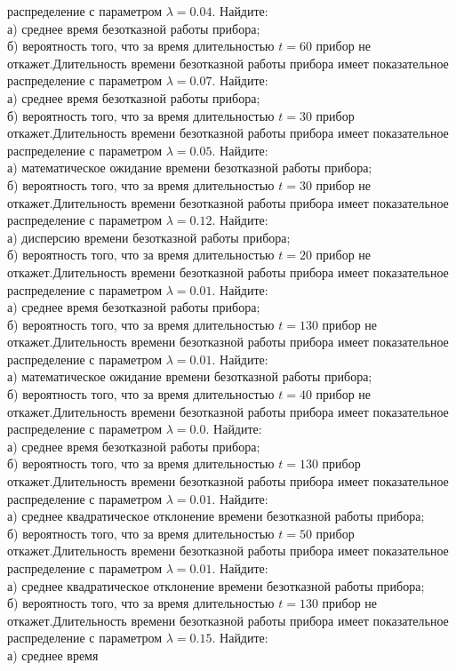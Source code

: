распределение с параметром $\lambda = 0.04$. Найдите: \\ \quad а) среднее время безотказной работы прибора; \\ \quad б) вероятность того, что за время длительностью $t = 60$ прибор не откажет.Длительность времени безотказной работы прибора имеет показательное распределение с параметром $\lambda = 0.07$. Найдите: \\ \quad а) среднее время безотказной работы прибора; \\ \quad б) вероятность того, что за время длительностью $t = 30$ прибор откажет.Длительность времени безотказной работы прибора имеет показательное распределение с параметром $\lambda = 0.05$. Найдите: \\ \quad а) математическое ожидание времени безотказной работы прибора; \\ \quad б) вероятность того, что за время длительностью $t = 30$ прибор не откажет.Длительность времени безотказной работы прибора имеет показательное распределение с параметром $\lambda = 0.12$. Найдите: \\ \quad а) дисперсию времени безотказной работы прибора; \\ \quad б) вероятность того, что за время длительностью $t = 20$ прибор не откажет.Длительность времени безотказной работы прибора имеет показательное распределение с параметром $\lambda = 0.01$. Найдите: \\ \quad а) среднее время безотказной работы прибора; \\ \quad б) вероятность того, что за время длительностью $t = 130$ прибор не откажет.Длительность времени безотказной работы прибора имеет показательное распределение с параметром $\lambda = 0.01$. Найдите: \\ \quad а) математическое ожидание времени безотказной работы прибора; \\ \quad б) вероятность того, что за время длительностью $t = 40$ прибор не откажет.Длительность времени безотказной работы прибора имеет показательное распределение с параметром $\lambda = 0.0$. Найдите: \\ \quad а) среднее время безотказной работы прибора; \\ \quad б) вероятность того, что за время длительностью $t = 130$ прибор откажет.Длительность времени безотказной работы прибора имеет показательное распределение с параметром $\lambda = 0.01$. Найдите: \\ \quad а) среднее квадратическое отклонение времени безотказной работы прибора; \\ \quad б) вероятность того, что за время длительностью $t = 50$ прибор откажет.Длительность времени безотказной работы прибора имеет показательное распределение с параметром $\lambda = 0.01$. Найдите: \\ \quad а) среднее квадратическое отклонение времени безотказной работы прибора; \\ \quad б) вероятность того, что за время длительностью $t = 130$ прибор не откажет.Длительность времени безотказной работы прибора имеет показательное распределение с параметром $\lambda = 0.15$. Найдите: \\ \quad а) среднее время 